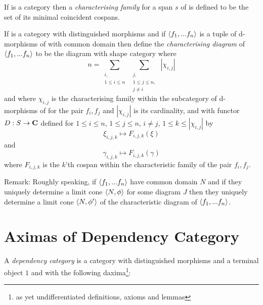 \documentclass[10pt,a4paper]{scrartcl}
\begin{document}
\begin{definition}
\noindent If  is a category  then a \textit{characterising family} for a span $s$ of  is defined to be the set of its minimal coincident cospans.
\end{definition}

\noindent 
\begin{definition}
If  is a category with distinguished morphisms 
and if $\langle f_1,...f_n\rangle$ is a tuple of d-morphisms of  
with common domain then define the \textit{characterising diagram} of 
$\langle f_1,...f_n\rangle$
to be the diagram with shape category \ndidly where 
$$n = 
\sum_{\substack{i,\\1 \leq i \leq n}} \  \sum_{\substack{j,\\ 1 \leq j \leq n,\\ j \neq i}} \ | \chi_{i,j} | $$
and where $\chi_{i,j}$ is the characterising family within the subcategory 
of d-morphisms of  for the pair $f_i,f_j$ and 
$|\chi_{i,j}|$ is its cardinality,
and with functor $D: S \rightarrow \textbf{C}$ defined for $1 \leq i \leq n$, $1 \leq j \leq n$, $i \neq j$, $1 \leq k \leq | \chi_{i,j} |$ by
$$ \xi_{i,j,k}   \mapsto F_{i,j,k}(\xi)$$
and
$$ \gamma_{i,j,k}   \mapsto F_{i,j,k}(\gamma) $$
where $F_{i,j,k}$ is the $k$'th cospan within the characteristic family of the pair $f_i,f_j$.
\end{definition}

\noindent
Remark: Roughly speaking, if $\langle f_1,...f_n\rangle$ have common domain $N$
and if they uniquely determine a limit cone $\langle N,\phi\rangle$ for some diagram $J$  then they uniquely determine a limit cone $\langle N,\phi'\rangle$
 of the characteristic diagram of $\langle f_1,...f_n\rangle$.


\section{Aximas of Dependency Category}
A  \textit{dependency category} 
is a category  with distinguished morphisms and a terminal object $1$ and with the following daxima\footnote{as yet undifferentiated definitions, axioms and lemmas}: 
\end{document}
